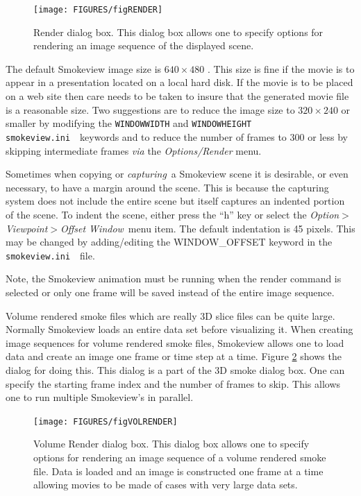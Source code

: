 \documentclass[11pt,twoside]{book}
\newcommand{\svini}{{\tt smokeview.ini}\ }
\begin{document}
\begin{figure}[\figoptions]
\centerline{
\texttt{[image: FIGURES/figRENDER]}
}
\caption[Render dialog box.]{Render dialog box. This dialog box allows one to specify
options for rendering an image sequence of the displayed scene.}
\label{figRENDER}
\end{figure}

The default Smokeview image size is $640\times 480$ .  This size
is fine if the movie is to appear in a presentation located on a
local hard disk.  If the movie is to be placed on a web site then
care needs to be taken to insure that the generated movie file is
a reasonable size.  Two suggestions are to reduce the image size
to $320\times 240$ or smaller by modifying the {\tt WINDOWWIDTH}
and {\tt WINDOWHEIGHT} \svini\ keywords  and to reduce the number
of frames to 300 or less by skipping intermediate frames {\em via}
the {\em Options/Render} menu.

Sometimes when copying or {\em capturing}\ a Smokeview scene it is
desirable, or even necessary, to have a margin around the scene.
This is because the capturing system does not include the entire
scene but itself captures an indented portion of the scene. To
indent the scene, either press the ``h'' key or select the {\em
Option$>$Viewpoint$>$Offset Window}\ menu item. The default
indentation is 45 pixels. This may be changed by adding/editing
the WINDOW\_OFFSET keyword in the \svini\ file.

Note, the Smokeview animation must be running when the render command is
selected or only one frame will be saved instead of the entire image sequence.

Volume rendered smoke files which are really 3D slice files can be quite large.
Normally Smokeview loads an entire data set before visualizing it.
When creating image sequences for volume rendered smoke files,
Smokeview allows one to load data and create an image one frame or time step at a time.
Figure \ref{figVOLRENDER} shows the dialog for doing this.  This dialog
is a part of the 3D smoke dialog box. One can specify the starting frame index
and the number of frames to skip.  This allows one to run multiple Smokeview's in
parallel.

\begin{figure}[\figoptions]
\centerline{
\texttt{[image: FIGURES/figVOLRENDER]}
}
\caption[Volume Render dialog box.]{Volume Render dialog box.
This dialog box allows one to specify
options for rendering an image sequence of a volume rendered smoke file. Data is loaded
and an image is constructed one frame at a time allowing movies to be made of cases
with very large data sets.
}
\label{figVOLRENDER}
\end{figure}
\end{document}
